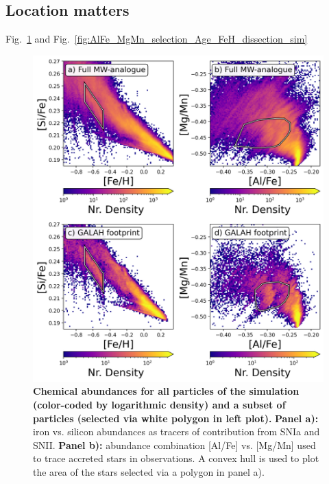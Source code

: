 \documentclass[fleqn,usenatbib]{mnras}
\begin{document}
\subsection{Location matters} \label{sec:location}

Fig.~\ref{fig:low_alpha_halo} and Fig.~\ref{fig:AlFe_MgMn_selection_Age_FeH_dissection_sim}

\begin{figure}
	\includegraphics[width=\columnwidth]{figures/low_alpha_halo_convex_hull.png}
    \caption{
    \textbf{Chemical abundances for all particles of the simulation (color-coded by logarithmic density) and a subset of particles (selected via white polygon in left plot).} 
    \textbf{Panel a):} iron vs. silicon abundances as tracers of contribution from SNIa and SNII. \textbf{Panel b):} abundance combination [Al/Fe] vs. [Mg/Mn] used to trace accreted stars in observations. A convex hull is used to plot the area of the stars selected via a polygon in panel a).}
    \label{fig:low_alpha_halo}
\end{figure}
\end{document}
